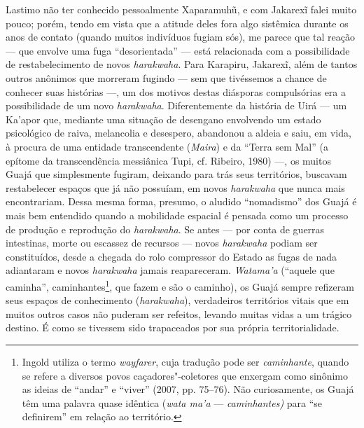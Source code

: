 Lastimo não ter conhecido pessoalmente Xaparamuhũ, e com Jakarexĩ falei
muito pouco; porém, tendo em vista que a atitude deles fora algo
sistêmica durante os anos de contato (quando muitos indivíduos fugiam
sós), me parece que tal reação --- que envolve uma fuga ``desorientada'' ---
está relacionada com a possibilidade de restabelecimento de novos
\emph{harakwaha}. Para Karapiru, Jakarexĩ, além de tantos outros
anônimos que morreram fugindo --- sem que tivéssemos a chance de conhecer
suas histórias ---, um dos motivos destas diásporas compulsórias era a
possibilidade de um novo \emph{harakwaha}. Diferentemente da história de
Uirá --- um Ka'apor que, mediante uma situação de desengano envolvendo um
estado psicológico de raiva, melancolia e desespero, abandonou a aldeia
e saiu, em vida, à procura de uma entidade transcendente (\emph{Maira})
e da ``Terra sem Mal'' (a epítome da transcendência messiânica Tupi, cf.
Ribeiro, 1980) ---, os muitos Guajá que simplesmente fugiram, deixando
para trás seus territórios, buscavam restabelecer espaços que já não
possuíam, em novos \emph{harakwaha} que nunca mais encontrariam. Dessa
mesma forma, presumo, o aludido ``nomadismo'' dos Guajá é mais bem
entendido quando a mobilidade espacial é pensada como um processo de
produção e reprodução do \emph{harakwaha}. Se antes --- por conta de
guerras intestinas, morte ou escassez de recursos --- novos
\emph{harakwaha} podiam ser constituídos, desde a chegada do rolo
compressor do Estado as fugas de nada adiantaram e novos
\emph{harakwaha} jamais reapareceram. \emph{Watama'a} (``aquele que
caminha'', caminhantes\footnote{Ingold utiliza o termo \emph{wayfarer},
  cuja tradução pode ser \emph{caminhante}, quando se refere a diversos
  povos caçadores"-coletores que enxergam como sinônimo as ideias de
  ``andar'' e ``viver'' (2007, pp. 75--76). Não curiosamente, os Guajá têm uma
  palavra quase idêntica (\emph{wata ma'a} --- \emph{caminhantes)} para
  ``se definirem'' em relação ao território.}, que fazem e são o caminho),
os Guajá sempre refizeram seus espaços de conhecimento
(\emph{harakwaha}), verdadeiros territórios vitais que em muitos outros
casos não puderam ser refeitos, levando muitas vidas a um trágico
destino. É como se tivessem sido trapaceados por sua própria
territorialidade.



